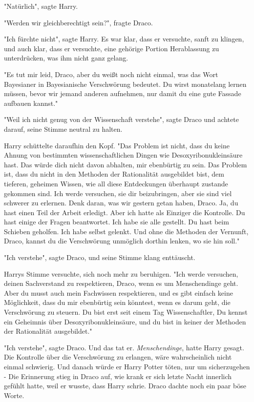 {"Natürlich", sagte Harry.

"Werden wir gleichberechtigt sein?", fragte Draco.

"Ich fürchte nicht", sagte Harry. Es war klar, dass er versuchte, sanft zu klingen, und auch klar, dass er versuchte, eine gehörige Portion Herablassung zu unterdrücken, was ihm nicht ganz gelang.

"Es tut mir leid, Draco, aber du weißt noch nicht einmal, was das Wort Bayesianer in Bayesianische Verschwörung bedeutet. Du wirst monatelang lernen müssen, bevor wir jemand anderen aufnehmen, nur damit du eine gute Fassade aufbauen kannst."

"Weil ich nicht genug von der Wissenschaft verstehe", sagte Draco und achtete darauf, seine Stimme neutral zu halten.

Harry schüttelte daraufhin den Kopf. "Das Problem ist nicht, dass du keine Ahnung von bestimmten wissenschaftlichen Dingen wie Desoxyribonukleinsäure hast. Das würde dich nicht davon abhalten, mir ebenbürtig zu sein. Das Problem ist, dass du nicht in den Methoden der Rationalität ausgebildet bist, dem tieferen, geheimen Wissen, wie all diese Entdeckungen überhaupt zustande gekommen sind. Ich werde versuchen, sie dir beizubringen, aber sie sind viel schwerer zu erlernen. Denk daran, was wir gestern getan haben, Draco. Ja, du hast einen Teil der Arbeit erledigt. Aber ich hatte als Einziger die Kontrolle. Du hast einige der Fragen beantwortet. Ich habe sie alle gestellt. Du hast beim Schieben geholfen. Ich habe selbst gelenkt. Und ohne die Methoden der Vernunft, Draco, kannst du die Verschwörung unmöglich dorthin lenken, wo sie hin soll."

"Ich verstehe", sagte Draco, und seine Stimme klang enttäuscht.

Harrys Stimme versuchte, sich noch mehr zu beruhigen. "Ich werde versuchen, deinen Sachverstand zu respektieren, Draco, wenn es um Menschendinge geht. Aber du musst auch mein Fachwissen respektieren, und es gibt einfach keine Möglichkeit, dass du mir ebenbürtig sein könntest, wenn es darum geht, die Verschwörung zu steuern. Du bist erst seit einem Tag Wissenschaftler, Du kennst ein Geheimnis über Desoxyribonukleinsäure, und du bist in keiner der Methoden der Rationalität ausgebildet."

"Ich verstehe", sagte Draco. Und das tat er. \emph{Menschendinge}, hatte Harry gesagt. Die Kontrolle über die Verschwörung zu erlangen, wäre wahrscheinlich nicht einmal schwierig. Und danach würde er Harry Potter töten, nur um sicherzugehen - Die Erinnerung stieg in Draco auf, wie krank er sich letzte Nacht innerlich gefühlt hatte, weil er wusste, dass Harry schrie. Draco dachte noch ein paar böse Worte.

}
